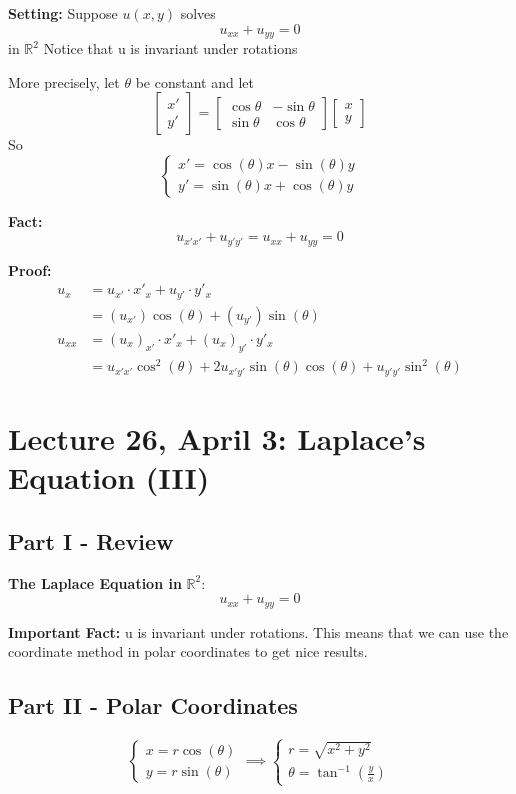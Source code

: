 \documentclass[12pt]{article}
\begin{document}
\textbf{Setting:} Suppose $u(x, y)$ solves 
\[u_{xx} + u_{yy} = 0\] 
in $\mathbb{R}^2$
Notice that u is invariant under rotations

More precisely, let $\theta$ be constant and let 
\[\begin{bmatrix}
    x'\\
    y'
\end{bmatrix} = \begin{bmatrix}
    \cos \theta & -\sin \theta\\
    \sin \theta & \cos \theta      
\end{bmatrix} \begin{bmatrix}
    x\\y
\end{bmatrix}\]
So
\[\begin{cases}
    x' = \cos(\theta) x - \sin(\theta)y\\
    y' = \sin(\theta)x + \cos(\theta) y 
\end{cases}\]

\textbf{Fact:}
\[u_{x'x'} + u_{y'y'} = u_{xx} + u_{yy} = 0\]

\textbf{Proof:}
\begin{align*}
    u_x &= u_{x'} \cdot x'_x + u_{y'}\cdot  y'_x\\
    &= (u_{x'})\cos(\theta) + (u_{y'})\sin(\theta)\\
    u_{xx} &= (u_x)_{x'} \cdot x'_x + (u_x)_{y'} \cdot y'_x\\
    &= u_{x'x'} \cos^2(\theta) + 2u_{x'y'}\sin(\theta) \cos(\theta) + u_{y'y'}\sin^2(\theta )
\end{align*}

\section*{Lecture 26, April 3: Laplace's Equation (III)}
\subsection*{Part I - Review}
\textbf{The Laplace Equation in} $\mathbb{R}^2$:
\[u_{xx} + u_{yy} = 0\]

\textbf{Important Fact:} u is invariant under rotations. This means that we can use the coordinate method in polar coordinates to get nice results. 

\subsection*{Part II - Polar Coordinates}
\[\begin{cases}
    x = r\cos(\theta)\\
    y= r\sin(\theta) 
\end{cases} \implies \begin{cases}
    r = \sqrt{x^2 + y^2}\\
    \theta = \tan^{-1}(\frac{y}{x})
\end{cases}\]
\end{document}
